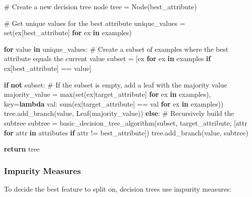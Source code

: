 \documentclass[
  letterpaper,
  DIV=11,
  numbers=noendperiod]{scrreprt}
\newenvironment{Shaded}{\begin{snugshade}}{\end{snugshade}}
\newcommand{\BuiltInTok}[1]{\textcolor[rgb]{0.00,0.23,0.31}{#1}}
\newcommand{\CommentTok}[1]{\textcolor[rgb]{0.37,0.37,0.37}{#1}}
\newcommand{\ControlFlowTok}[1]{\textcolor[rgb]{0.00,0.23,0.31}{\textbf{#1}}}
\newcommand{\KeywordTok}[1]{\textcolor[rgb]{0.00,0.23,0.31}{\textbf{#1}}}
\newcommand{\NormalTok}[1]{\textcolor[rgb]{0.00,0.23,0.31}{#1}}
\newcommand{\OperatorTok}[1]{\textcolor[rgb]{0.37,0.37,0.37}{#1}}
\begin{document}
\begin{Shaded}
\begin{Highlighting}[]
    \CommentTok{\# Create a new decision tree node}
\NormalTok{    tree }\OperatorTok{=}\NormalTok{ Node(best\_attribute)}
    
    \CommentTok{\# Get unique values for the best attribute}
\NormalTok{    unique\_values }\OperatorTok{=} \BuiltInTok{set}\NormalTok{(ex[best\_attribute] }\ControlFlowTok{for}\NormalTok{ ex }\KeywordTok{in}\NormalTok{ examples)}
    
    \ControlFlowTok{for}\NormalTok{ value }\KeywordTok{in}\NormalTok{ unique\_values:}
        \CommentTok{\# Create a subset of examples where the best attribute equals the current value}
\NormalTok{        subset }\OperatorTok{=}\NormalTok{ [ex }\ControlFlowTok{for}\NormalTok{ ex }\KeywordTok{in}\NormalTok{ examples }\ControlFlowTok{if}\NormalTok{ ex[best\_attribute] }\OperatorTok{==}\NormalTok{ value]}
        
        \ControlFlowTok{if} \KeywordTok{not}\NormalTok{ subset:}
            \CommentTok{\# If the subset is empty, add a leaf with the majority value}
\NormalTok{            majority\_value }\OperatorTok{=} \BuiltInTok{max}\NormalTok{(}\BuiltInTok{set}\NormalTok{(ex[target\_attribute] }\ControlFlowTok{for}\NormalTok{ ex }\KeywordTok{in}\NormalTok{ examples), key}\OperatorTok{=}\KeywordTok{lambda}\NormalTok{ val: }\BuiltInTok{sum}\NormalTok{(ex[target\_attribute] }\OperatorTok{==}\NormalTok{ val }\ControlFlowTok{for}\NormalTok{ ex }\KeywordTok{in}\NormalTok{ examples))}
\NormalTok{            tree.add\_branch(value, Leaf(majority\_value))}
        \ControlFlowTok{else}\NormalTok{:}
            \CommentTok{\# Recursively build the subtree}
\NormalTok{            subtree }\OperatorTok{=}\NormalTok{ basic\_decision\_tree\_algorithm(subset, target\_attribute, [attr }\ControlFlowTok{for}\NormalTok{ attr }\KeywordTok{in}\NormalTok{ attributes }\ControlFlowTok{if}\NormalTok{ attr }\OperatorTok{!=}\NormalTok{ best\_attribute])}
\NormalTok{            tree.add\_branch(value, subtree)}
    
    \ControlFlowTok{return}\NormalTok{ tree}
\end{Highlighting}
\end{Shaded}

\subsubsection{Impurity Measures}\label{impurity-measures}

To decide the best feature to split on, decision trees use impurity
measures:
\end{document}
